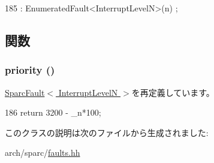 \begin{DoxyCode}
185 : EnumeratedFault<InterruptLevelN>(n) {;}
\end{DoxyCode}


\subsection{関数}
\hypertarget{classSparcISA_1_1InterruptLevelN_a57b9ac2b92afbf2567e6d7b131900712}{
\subsubsection[{priority}]{ priority ()}}
\label{classSparcISA_1_1InterruptLevelN_a57b9ac2b92afbf2567e6d7b131900712}


\hyperlink{classSparcISA_1_1SparcFault_a57b9ac2b92afbf2567e6d7b131900712}{SparcFault$<$ InterruptLevelN $>$}を再定義しています。


\begin{DoxyCode}
186 { return 3200 - _n*100; }
\end{DoxyCode}


このクラスの説明は次のファイルから生成されました:\begin{DoxyCompactItemize}
\item 
arch/sparc/\hyperlink{arch_2sparc_2faults_8hh}{faults.hh}\end{DoxyCompactItemize}
